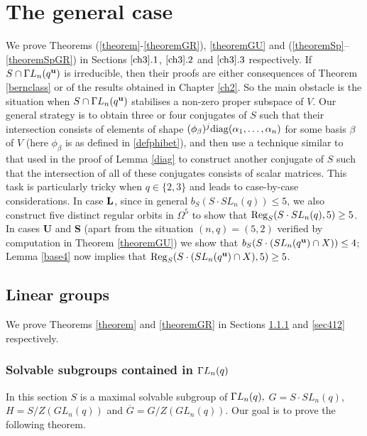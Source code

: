 \chapter{The general case}
\label{ch3}
 We prove Theorems (\ref{theorem}-\ref{theoremGR}), \ref{theoremGU} and (\ref{theoremSp}--\ref{theoremSpGR}) in Sections $\ref{ch3}.1$, $\ref{ch3}.2$ and $\ref{ch3}.3$ respectively. If $S \cap {{\Gamma L}}_n(q^{\bf u})$ is irreducible, then  their proofs are either consequences of Theorem \ref{bernclass} or of the results obtained in Chapter \ref{ch2}.   So the main obstacle  is the situation when $S\cap {{\Gamma L}}_n(q^{\bf u})$ stabilises a non-zero proper subspace of $V$. Our general strategy is to obtain three or four  conjugates of $S$ such that their intersection consists of elements of shape $(\phi_{\beta})^j \mathrm{diag}(\alpha_1, \ldots, \alpha_n)$ for some basis $\beta$ of $V$ (here $\phi_{\beta}$ is as defined in \eqref{defphibet}), and then use a technique similar to that used in the proof of Lemma \ref{diag} to construct another conjugate of $S$ such that the intersection of all of these conjugates consists of scalar matrices. This task is  particularly tricky  when $q \in \{2,3\}$ and  leads to case-by-case considerations. In case ${\bf L}$, since in general $b_S(S \cdot SL_n(q)) \le 5$, we also construct five distinct regular orbits in $\Omega^5$ to show that $\mathrm{Reg}_S(S \cdot SL_n(q),5)\ge 5$.  In cases {\bf U} and {\bf S} (apart from the situation $(n,q)=(5,2)$ verified by computation in Theorem \ref{theoremGU}) we show that $b_S(S \cdot (SL_n(q^{\bf u}) \cap X))\le 4$; Lemma \ref{base4} now implies that $\mathrm{Reg}_S(S \cdot (SL_n(q^{\bf u}) \cap X),5)\ge 5$. 

  

\section{Linear groups}\label{secproof}

We prove Theorems \ref{theorem} and \ref{theoremGR} in Sections \ref{sec411} and \ref{sec412} respectively.

\subsection{Solvable subgroups contained in ${{\Gamma L}}_n(q)$}
\label{sec411}

In this section $S$ is a maximal solvable subgroup of ${{\Gamma L}}_n(q),$ $G=S \cdot SL_n(q)$, $H=S/Z(GL_n(q))$ and $\overline{G}=G/Z(GL_n(q)).$ Our goal is to prove the following theorem.

